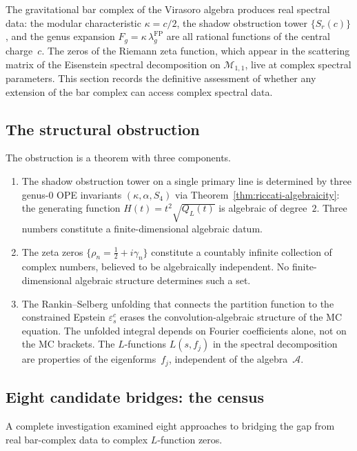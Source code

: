 \documentclass[11pt]{article}
\newcommand{\cA}{\mathcal{A}}
\newcommand{\cM}{\mathcal{M}}
\begin{document}
The gravitational bar complex of the Virasoro algebra produces
real spectral data: the modular characteristic $\kappa = c/2$,
the shadow obstruction tower $\{S_r(c)\}$, and the genus expansion
$F_g = \kappa\,\lambda_g^{\mathrm{FP}}$ are all rational
functions of the central charge~$c$.  The zeros of the
Riemann zeta function, which appear in the scattering matrix
of the Eisenstein spectral decomposition on $\cM_{1,1}$, live
at complex spectral parameters.  This section records the
definitive assessment of whether any extension of the bar
complex can access complex spectral data.

\subsection{The structural obstruction}

The obstruction is a theorem with three components.

\begin{enumerate}
\item The shadow obstruction tower on a single primary line is determined
by three genus-$0$ OPE invariants $(\kappa, \alpha, S_4)$
via Theorem~\ref{thm:riccati-algebraicity}: the generating
function $H(t) = t^2\sqrt{Q_L(t)}$ is algebraic of degree~$2$.
Three numbers constitute a finite-dimensional algebraic datum.

\item The zeta zeros $\{\rho_n = \tfrac{1}{2} + i\gamma_n\}$
constitute a countably infinite collection of complex numbers,
believed to be algebraically independent.  No finite-dimensional
algebraic structure determines such a set.

\item The Rankin--Selberg unfolding that connects the partition
function to the constrained Epstein $\varepsilon^c_s$ erases
the convolution-algebraic structure of the MC equation.  The
unfolded integral depends on Fourier coefficients alone, not on
the MC brackets.  The $L$-functions $L(s, f_j)$ in the
spectral decomposition are properties of the eigenforms~$f_j$,
independent of the algebra~$\cA$.
\end{enumerate}

\subsection{Eight candidate bridges: the census}

A complete investigation examined eight approaches to bridging
the gap from real bar-complex data to complex $L$-function
zeros.
\end{document}
